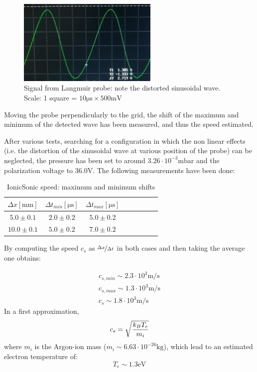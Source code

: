 \documentclass[11pt,a4 paper]{article}
\let\oldfrac\frac
\renewcommand{\frac}[3][d]{\ifthenelse{\equal{#1}{d}}{\oldfrac{#2}{#3}}{\nicefrac{#2}{#3}}}
\begin{document}
\begin{figure}[H]
  \centering
  \includegraphics[width=0.6\textwidth]{img/ionicsonic/oscill.jpg}
  \caption{Signal from Langmuir probe: note the distorted sinusoidal wave. Scale: 1 square = $10\si{\micro\second}\times500\si{\milli\volt}$}
  \label{fig:isspeed:oscill}
\end{figure}

Moving the probe perpendicularly to the grid, the shift of the maximum and minimum of the detected wave has been measured, and thus the speed estimated.

After various tests, searching for a configuration in which the non linear effects (i.e. the distortion of the sinusoidal wave at various position of the probe) can be neglected, the pressure has been set to around $3.26\cdot10^{-3}\si{\milli\bar}$ and the polarization voltage to $36.0\si{\volt}$. The following measurements have been done:
\begin{table}[H]
  \centering
  \begin{tabular}{cccccccc}
    \toprule
    $\Delta x [\si{\milli\metre}]$ & $\Delta t_{min} [\si{\micro\second}]$ & $\Delta t_{max} [\si{\micro\second}]$ \\
    \midrule
    $5.0\pm0.1$ & $2.0\pm0.2$ & $5.0\pm0.2$\\
    $10.0\pm0.1$ & $5.0\pm0.2$ & $7.0\pm0.2$\\
    \bottomrule
  \end{tabular}
  \caption{IonicSonic speed: maximum and minimum shifts}
  \label{tab:isspeed}
\end{table}

By computing the speed $c_s$ as $\frac[f]{\Delta x}{\Delta t}$ in both cases and then taking the average one obtains:

\begin{gather*}
  c_{s,min} \sim 2.3\cdot10^{3} \si{\metre\per\second} \\
  c_{s,max} \sim 1.3\cdot10^{3} \si{\metre\per\second} \\
  c_s \sim 1.8\cdot10^{3} \si{\metre\per\second}
\end{gather*}
In a first approximation,
\begin{equation*}
  c_s = \sqrt{\frac{k_B T_e}{m_i}}
\end{equation*}
where $m_i$ is the Argon-ion mass ($m_i\sim6.63\cdot10^{-26}\si{\kilo\gram}$), which lead to an estimated electron temperature of:
\begin{equation*}
  T_e \sim 1.3\si{\electronvolt}
\end{equation*}
\end{document}
